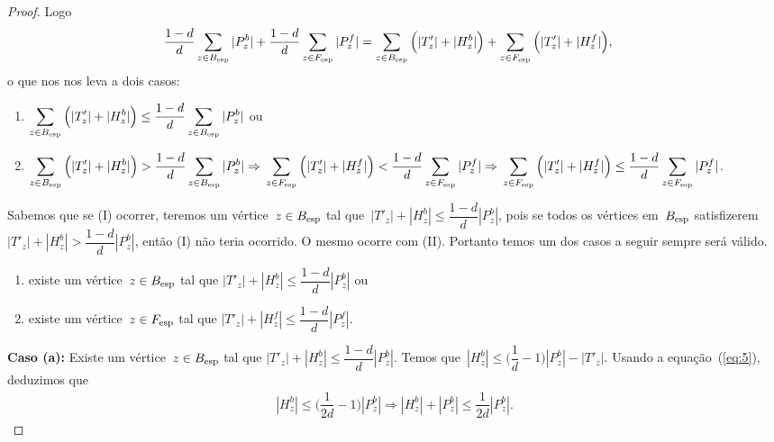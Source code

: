 \begin{proof}
			Logo
	\begin{align}
			\dfrac{1-d}{d}\displaystyle\sum_{z\in B_{\mathrm{esp}}}|P_z^b| &+ 
			\dfrac{1-d}{d}\displaystyle\sum_{z\in F_{\mathrm{esp}}}|P_z^f|
			= \displaystyle\sum_{z\in B_{\mathrm{esp}}}
			\Big(|T'_{z}|+|H_z^b|\Big) + 
			\displaystyle\sum_{z\in F_{\mathrm{esp}}}
			\Big(|T'_{z}|+|H_z^f|\Big),\nonumber
	\end{align}
	o que nos nos leva a dois casos:
	\begin{enumerate}[label=(\Roman*)]   %
		\item $\displaystyle\sum_{z\in B_{\mathrm{esp}}}
			\Big(|T'_{z}|+|H_z^b|\Big)\le
			\dfrac{1-d}{d}\displaystyle\sum_{z\in B_{\mathrm{esp}}}|P_z^b|$
			ou
		\item $\displaystyle\sum_{z\in B_{\mathrm{esp}}}
			\Big(|T'_{z}|+|H_z^b|\Big)>
			\dfrac{1-d}{d}\displaystyle\sum_{z\in B_{\mathrm{esp}}}|P_z^b|
			\Rightarrow \\
			\displaystyle\sum_{z\in F_{\mathrm{esp}}}
			\Big(|T'_{z}|+|H_z^f|\Big)<
			\dfrac{1-d}{d}\displaystyle\sum_{z\in F_{\mathrm{esp}}}|P_z^f|
			\Rightarrow \\
			\displaystyle\sum_{z\in F_{\mathrm{esp}}}
			\Big(|T'_{z}|+|H_z^f|\Big)\le
			\dfrac{1-d}{d}\displaystyle\sum_{z\in F_{\mathrm{esp}}}|P_z^f|$.
	\end{enumerate}

	Sabemos que se (I) ocorrer, teremos um 
	vértice~${z\in B_{\mathrm{esp}}}$ tal que~${|T'_z|+|H^b_z|\le \dfrac{1-d}{d}|P^b_z|}$,
	pois se todos os vértices em~$B_{\mathrm{esp}}$ 
	satisfizerem~${|T'_z|+|H^b_z| > \dfrac{1-d}{d}|P^b_z|}$, então (I)
	não teria ocorrido.
	O mesmo ocorre com (II). 
	Portanto temos um dos casos
	a seguir sempre será válido.

	\begin{enumerate}[label=(\alph*)]
		\item existe um vértice~$z\in B_{\mathrm{esp}}$ 
			tal que $|T'_{z}|+|H_z^b|\le
			\dfrac{1-d}{d}|P_z^b|$ ou
		\item existe um vértice~$z\in F_{\mathrm{esp}}$ 
			tal que $|T'_{z}|+|H_z^f|\le
			\dfrac{1-d}{d}|P_z^f|.$
	\end{enumerate}

	\bigskip
	\bigskip
	
	\textbf{Caso (a):}
		Existe um vértice~$z\in B_{\mathrm{esp}}$ 
		tal que ${|T'_{z}|+|H_z^b|\le
		\dfrac{1-d}{d}|P_z^b|}$. 
		Temos
		que~${|H^b_z|\le \Big(\dfrac{1}{d}-1\Big)|P^b_z|-|T'_z|}$.
		Usando a equação~(\ref{eq:5}), deduzimos
		que
		\begin{align}
			|H^b_z|\le\Big(\dfrac{1}{2d}-1\Big)|P^b_z|
			\Rightarrow
			|H^b_z|+|P^b_z|\le\dfrac{1}{2d}|P^b_z|. \nonumber
		\end{align}


\end{proof}
